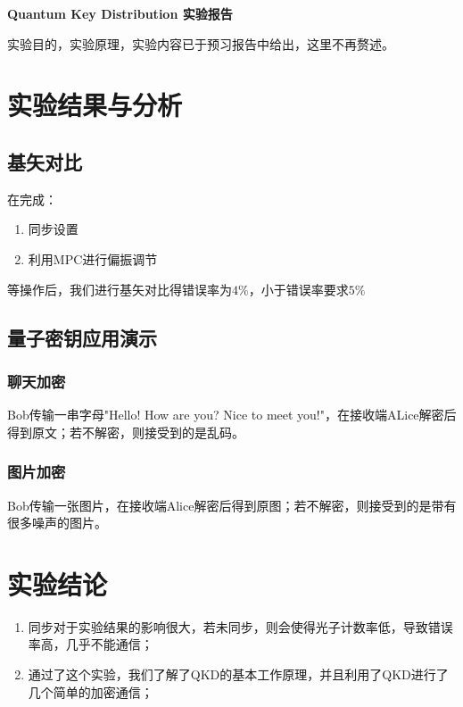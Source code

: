 \documentclass[a4paper,UTF8]{ctexart}
\begin{document}
\begin{center}
    \textbf{\Large Quantum Key Distribution 实验报告}
    \par {}
\end{center}

实验目的，实验原理，实验内容已于预习报告中给出，这里不再赘述。

\section{实验结果与分析}

\subsection{基矢对比}

在完成：

\begin{enumerate}
    \item 同步设置
    \item 利用MPC进行偏振调节
\end{enumerate}

等操作后，我们进行基矢对比得错误率为$4\%$，小于错误率要求$5\%$

\subsection{量子密钥应用演示}

\subsubsection{聊天加密}

Bob传输一串字母"Hello! How are you? Nice to meet you!"，在接收端ALice解密后得到原文；若不解密，则接受到的是乱码。

\subsubsection{图片加密}

Bob传输一张图片，在接收端Alice解密后得到原图；若不解密，则接受到的是带有很多噪声的图片。

\section{实验结论}

\begin{enumerate}
    \item 同步对于实验结果的影响很大，若未同步，则会使得光子计数率低，导致错误率高，几乎不能通信；
    \item 通过了这个实验，我们了解了QKD的基本工作原理，并且利用了QKD进行了几个简单的加密通信；
\end{enumerate}
\end{document}
